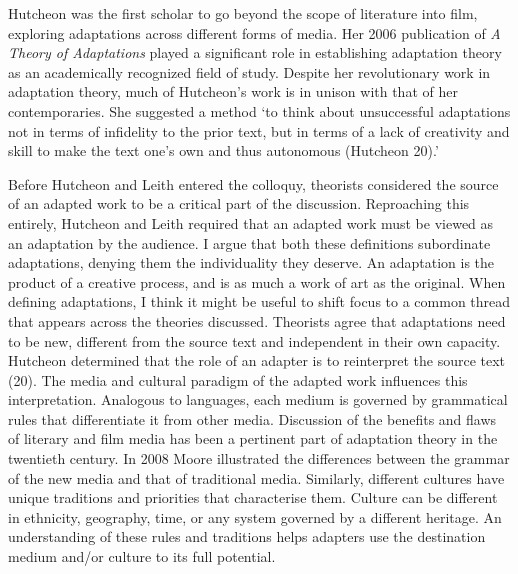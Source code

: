 \documentclass[12pt]{article}
\begin{document}
Hutcheon was the first scholar to go beyond the scope of literature into film, 
exploring adaptations across different forms of media. 
Her 2006 publication of \textit{A Theory of Adaptations} played a significant 
role in establishing adaptation theory as an academically recognized field of
study. Despite her revolutionary work in adaptation theory, much of
Hutcheon's work is in unison with that of her contemporaries. She 
suggested a method `to think about unsuccessful adaptations \textellipsis not 
in terms of infidelity to the prior text, but in terms of a lack of
creativity and skill to make the text one's own and thus autonomous (Hutcheon
20).'

Before Hutcheon and Leith entered the colloquy, theorists considered 
the source of an adapted work to be a critical part of the discussion.
Reproaching this entirely, Hutcheon and Leith required that an adapted work must
be viewed as an adaptation by the audience. I argue that both these
definitions subordinate adaptations, denying them the individuality they
deserve.  An adaptation is the product of a creative process, and is as much 
a work of art as the original. When defining adaptations, I think it might
be useful to shift focus to a common thread that appears across the theories 
discussed. Theorists agree that adaptations 
need to be new, different from the source text and independent in their 
own capacity. Hutcheon determined that the role of an adapter is to 
reinterpret the source text (20). The media and cultural paradigm of the adapted 
work influences this interpretation. Analogous to languages, each medium is
governed by grammatical rules that differentiate it from other media.
Discussion of the benefits and flaws of literary and
film media has been a pertinent part of adaptation theory in the twentieth century.
In 2008 Moore illustrated the differences between
the grammar of the new media and that of traditional media. 
Similarly, different cultures have unique traditions and priorities
that characterise them. Culture can be different in ethnicity,
geography, time, or any system governed by a different heritage. 
An understanding of these rules and traditions helps 
adapters use the destination medium and/or culture to its full potential. 
\end{document}

